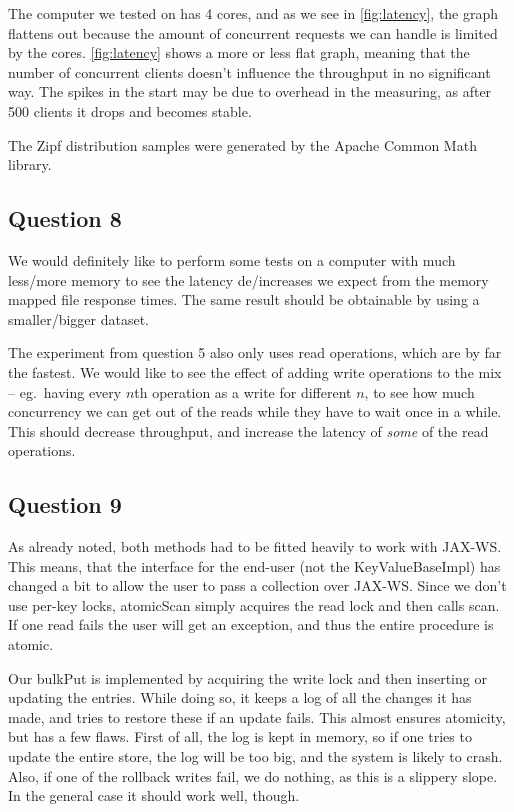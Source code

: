 \documentclass[a4paper,final]{article}
\newcommand{\mono}[1]{{\ttfamily#1}}
\begin{document}
The computer we tested on has 4 cores, and as we see in \autoref{fig:latency},
the graph flattens out because the amount of concurrent requests we can handle
is limited by the cores. \autoref{fig:latency} shows a more or less flat graph,
meaning that the number of concurrent clients doesn't influence the throughput
in no significant way. The spikes in the start may be due to overhead in the
measuring, as after 500 clients it drops and becomes stable.

The Zipf distribution samples were generated by the Apache Common Math library.

\subsection*{Question 8}
We would definitely like to perform some tests on a computer with much
less/more memory to see the latency de/increases we expect from the
memory mapped file response times. The same result should be obtainable by
using a smaller/bigger dataset.

The experiment from question 5 also only uses \mono{read} operations, which
are by far the fastest. We would like to see the effect of adding \mono{write}
operations to the mix -- eg.~having every $n$th operation as a write for
different $n$, to see how much concurrency we can get out of the reads while
they have to wait once in a while. This should decrease throughput, and
increase the latency of \emph{some} of the read operations.

\subsection*{Question 9}
As already noted, both methods had to be fitted heavily to work with JAX-WS.
This means, that the interface for the end-user (not the
\mono{KeyValueBaseImpl}) has changed a bit to allow the user to pass a
collection over JAX-WS. Since we don't use per-key locks, \mono{atomicScan}
simply acquires the read lock and then calls \mono{scan}. If one read fails
the user will get an exception, and thus the entire procedure is atomic.

Our \mono{bulkPut} is implemented by acquiring the write lock and then
inserting or updating the entries. While doing so, it keeps a log of all the
changes it has made, and tries to restore these if an update fails. This
almost ensures atomicity, but has a few flaws. First of all, the log is kept
in memory, so if one tries to update the entire store, the log will be too
big, and the system is likely to crash. Also, if one of the rollback writes
fail, we do nothing, as this is a slippery slope. In the general case it
should work well, though.
\end{document}
